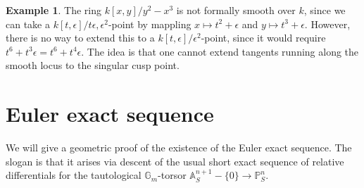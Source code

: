 \documentclass[10pt]{article}
\theoremstyle{definition}
\newtheorem{exmp}[thm]{Example}
\newtheorem{defn}[thm]{Definition}
\newcommand{\G}{\mathbb{G}}
\newcommand{\todo}[1]{\textbf{\textcolor{red}{TODO #1}}}
\begin{document}
%
%

\begin{exmp}
The ring $k[x,y]/y^2 - x^3$ is not formally smooth over $k$, since we can take a $k[t, \epsilon]/t\epsilon, \epsilon^2$-point by mappling $x \mapsto t^2 + \epsilon$ and $y \mapsto t^3 + \epsilon$.  However, there is no way to extend this to a $k[t, \epsilon]/\epsilon^2$-point, since it would require $t^6 + t^3\epsilon = t^6 + t^4\epsilon$.  The idea is that one cannot extend tangents running along the smooth locus to the singular cusp point.
\end{exmp}

\newpage


\section{Euler exact sequence}

We will give a geometric proof of the existence of the Euler exact sequence.  The slogan is that it arises via descent of the usual short exact sequence of relative differentials for the tautological $\G_m$-torsor $\mathbb{A}^{n+1}_S - \{0\} \rightarrow \mathbb{P}^n_S$.
\end{document}
